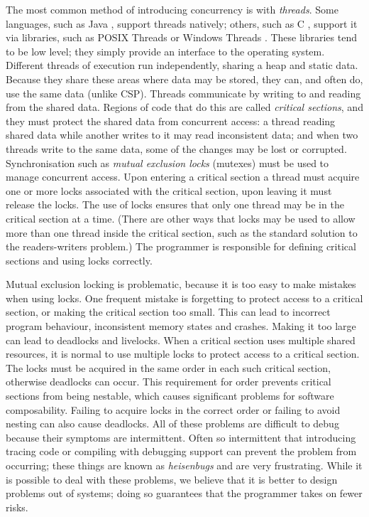 The most common method of introducing concurrency is with \emph{threads}.
Some languages, such as Java \citep{java-threads}, 
support threads natively; 
others, such as C \citep{c}, support it via libraries,
such as
POSIX Threads \citep{butenhof1997:pthreads} or Windows
Threads \citep{winthreads}.
These libraries tend to be low level;
they simply provide an interface to the operating system.
Different threads of execution run independently,
sharing a heap and static data.
Because they share these areas where data may be stored,
they can, and often do,
use the same data (unlike CSP).
Threads communicate by writing to and reading from the shared data.
Regions of code that do this are called \emph{critical sections},
and they must protect the shared data from concurrent access:
a thread reading shared data while another writes to it may read
inconsistent data;
and when two threads write to the same data,
some of the changes may be lost or corrupted.
Synchronisation such as \emph{mutual exclusion locks} (mutexes)
\citep{Dijkstra:Mutex} must be used to manage concurrent access.
Upon entering a critical section a thread must acquire one or more locks
associated with the critical section,
upon leaving it must release the locks.
The use of locks ensures that only one thread may be in the critical section
at a time.
(There are other ways that locks may be used to allow more than one thread
inside the critical section, such as the standard solution to the
readers-writers problem.)
The programmer is responsible for defining critical sections and using locks
correctly.

Mutual exclusion locking is problematic,
because it is too easy to make mistakes when using locks.
One frequent mistake is forgetting to protect access to a critical
section, or
making the critical section too small.
This can lead to incorrect program behaviour, inconsistent memory states and
crashes.
Making it too large can lead to deadlocks and livelocks.
When a critical section uses multiple shared resources,
it is normal to use multiple locks to protect access to a critical section.
The locks must be acquired in the same order in each such critical section,
otherwise deadlocks can occur.
This requirement for order prevents critical sections from being
nestable,
which causes significant problems for software composability.
Failing to acquire locks in the correct order or
failing to avoid nesting can also cause deadlocks.
All of these problems are difficult to debug because their symptoms are
intermittent.
Often so intermittent that introducing tracing code or compiling with debugging
support can prevent the problem from occurring;
these things are known as \emph{heisenbugs} and are very frustrating.
While it is possible to deal with these problems,
we believe that it is better to design problems out of systems;
doing so guarantees that the programmer takes on fewer risks.

